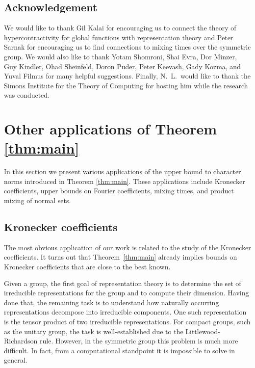 \documentclass[11pt, letterpaper]{amsart}
\begin{document}
\subsection*{Acknowledgement}
We would like to thank Gil Kalai for encouraging us to connect the theory of hypercontractivity for global functions with representation theory and Peter Sarnak for encouraging us to find connections to mixing times over the symmetric group. We would also like to thank Yotam Shomroni, Shai Evra, Dor Minzer, Guy Kindler, Ohad Sheinfeld, Doron Puder, Peter Keevash, Gady Kozma, and Yuval Filmus for many helpful suggestions. Finally, N.\ L.\ would like to thank the Simons Institute for the Theory of Computing for hosting him while the research was conducted.

\section{Other applications of Theorem \ref{thm:main}}\label{sec:other applications}
In this section we present various applications of the upper bound to character norms introduced in Theorem \ref{thm:main}. These applications include Kronecker coefficients, upper bounds on Fourier coefficients, mixing times, and product mixing of normal sets.

\subsection{Kronecker coefficients}
The most obvious application of our work is related to the study of the Kronecker coefficients. It turns out that Theorem~\ref{thm:main} already implies bounds on Kronecker coefficients that are close to the best known.

Given a group, the first goal of representation theory is to determine the set of irreducible representations for the group and to compute their dimension. Having done that, the remaining task is to understand how naturally occurring representations decompose into irreducible components. One such representation is the tensor product of two irreducible representations. For compact groups, such as the unitary group, the task is well-established due to the Littlewood-Richardson rule. However, in the symmetric group this problem is much more difficult. In fact, from a computational standpoint it is impossible to solve in general. 
\end{document}
